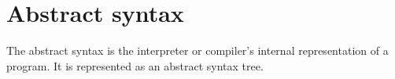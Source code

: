 \section{Abstract syntax}

The abstract syntax is the interpreter or compiler's internal representation of a program. It is represented
as an abstract syntax tree.

